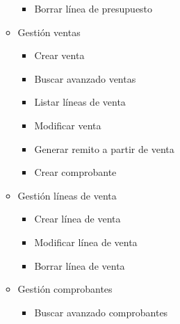 \begin{itemize}
\begin{itemize}
\begin{itemize}
                \item Borrar línea de presupuesto
            \end{itemize}
            \item Gestión ventas
            \begin{itemize}
                \item Crear venta
                \item Buscar avanzado ventas
                \item Listar líneas de venta
                \item Modificar venta
                \item Generar remito a partir de venta
                \item Crear comprobante
            \end{itemize}
            \item Gestión líneas de venta
            \begin{itemize}
                \item Crear línea de venta
                \item Modificar línea de venta
                \item Borrar línea de venta
            \end{itemize}
            \item Gestión comprobantes
            \begin{itemize}
                \item Buscar avanzado comprobantes
            \end{itemize}
        \end{itemize}
        

\end{itemize}
